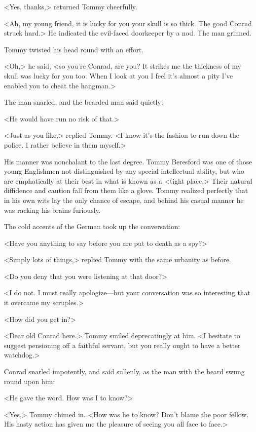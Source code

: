 <Yes, thanks,> returned Tommy cheerfully.

<Ah, my young friend, it is lucky for you your skull is so thick. The good Conrad struck hard.> He indicated the evil-faced doorkeeper by a nod. The man grinned.

Tommy twisted his head round with an effort.

<Oh,> he said, <so you're Conrad, are you? It strikes me the thickness of my skull was lucky for you too. When I look at you I feel it's almost a pity I've enabled you to cheat the hangman.>

The man snarled, and the bearded man said quietly:

<He would have run no risk of that.>

<Just as you like,> replied Tommy. <I know it's the fashion to run down the police. I rather believe in them myself.>

His manner was nonchalant to the last degree. Tommy Beresford was one of those young Englishmen not distinguished by any special intellectual ability, but who are emphatically at their best in what is known as a <tight place.> Their natural diffidence and caution fall from them like a glove. Tommy realized perfectly that in his own wits lay the only chance of escape, and behind his casual manner he was racking his brains furiously.

The cold accents of the German took up the conversation:

<Have you anything to say before you are put to death as a spy?>

<Simply lots of things,> replied Tommy with the same urbanity as before.

<Do you deny that you were listening at that door?>

<I do not. I must really apologize—but your conversation was so interesting that it overcame my scruples.>

<How did you get in?>

<Dear old Conrad here.> Tommy smiled deprecatingly at him. <I hesitate to suggest pensioning off a faithful servant, but you really ought to have a better watchdog.>

Conrad snarled impotently, and said sullenly, as the man with the beard swung round upon him:

<He gave the word. How was I to know?>

<Yes,> Tommy chimed in. <How was he to know? Don't blame the poor fellow. His hasty action has given me the pleasure of seeing you all face to face.>

